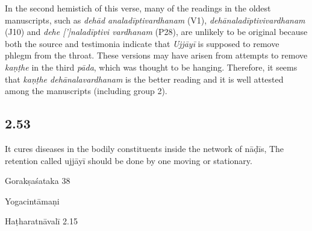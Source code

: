 \begin{ekdosis}
\begin{testimonia}[hp02_052]
\begin{versinnote}
\end{versinnote}
\end{testimonia}

\begin{philcomm}[hp02_052]
In the second hemistich of this verse, many of the readings in the oldest manuscripts, such as \emph{dehād analadīptivardhanam} (V1), \emph{dehānaladīptivivardhanam} (J10) and \emph{dehe [’]naladīptivi vardhanam} (P28), are unlikely to be original because both the source and testimonia indicate that \emph{Ujjāyī} is supposed to remove phlegm from the throat. These versions may have arisen from attempts to remove \emph{kaṇṭhe} in the third \emph{pāda}, which was thought to be hanging. Therefore, it seems that \emph{kaṇṭhe dehānalavardhanam} is the better reading and it is well attested among the manuscripts (including group 2).
\end{philcomm}

\subsection*{2.53}
\begin{translation}[hp02_053]
It cures diseases in the bodily constituents inside the network of nāḍīs,
The retention called ujjāyī should be done by one moving or stationary.
\end{translation}

\begin{sources}[hp02_053]
Gorakṣaśataka 38

\begin{versinnote}
\end{versinnote}
\end{sources}

\begin{testimonia}[hp02_053]
Yogacintāmaṇi

\begin{versinnote}
\end{versinnote}
Haṭharatnāvalī 2.15


\end{testimonia}
\end{ekdosis}

